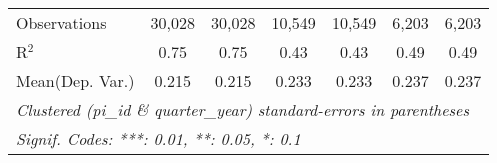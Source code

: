 \begin{tabular}{lcccccc}
   Observations                                                & 30,028        & 30,028       & 10,549       & 10,549       & 6,203          & 6,203\\  
   R$^2$                                                       & 0.75          & 0.75         & 0.43         & 0.43         & 0.49           & 0.49\\  
Mean(Dep. Var.) & 0.215 & 0.215 & 0.233 & 0.233 & 0.237 & 0.237 \\
   \midrule \midrule
   \multicolumn{7}{l}{\emph{Clustered (pi\_id \& quarter\_year) standard-errors in parentheses}}\\
   \multicolumn{7}{l}{\emph{Signif. Codes: ***: 0.01, **: 0.05, *: 0.1}}\\
\end{tabular}
\par\endgroup
